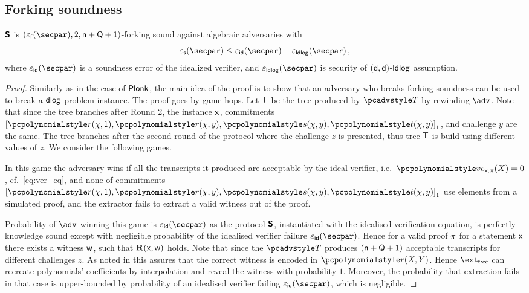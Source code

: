 \subsection{Forking soundness}
\begin{lemma}
	\label{lem:sonicprot_ss}
	$\bm{\mathsf{S}}$ is $(\epsss(\secpar), 2, \multconstr + \linconstr + 1)$-forking sound against
	algebraic adversaries with
	\[
	\epss(\secpar) \leq \epsid(\secpar) + \epsldlog(\secpar) \,,
	\]
	where $\epsid(\secpar)$ is a soundness error of the idealized verifier, and
	$\epsldlog(\secpar)$ is security of $(\mathsf{d}, \mathsf{d})$-$\mathsf{ldlog}$ assumption.
\end{lemma}
\begin{proof}
	Similarly as in the case of $\textnormal{\textsf{Plonk}}$, the main idea of the proof is to show
	that an adversary who breaks forking soundness can be used to break a $\mathsf{dlog}$ problem
	instance. The proof goes by game hops. Let $\mathsf{T}$ be the tree produced by
	$\tdv$ by rewinding $\adv$. Note that since the tree branches after Round 2,
	the instance $\mathsf{x}$, commitments
	$\gone{\p{r} (\chi, 1), \p{r} (\chi, y), \p{s} (\chi, y), \p{t} (\chi, y)}$, and challenge
	$y$ are the same. The tree branches after the second round
	of the protocol where the challenge $z$ is presented, thus tree $\mathsf{T}$ is
	build using different values of $z$.
	We consider the following games.
	
	 In this game the adversary wins if all the transcripts it
	produced are acceptable by the ideal verifier,
	i.e.~$\vereq_{\inp, \zkproof}(X) = 0$, cf.~\cref{eq:ver_eq}, and none of
	commitments
	$\gone{\p{r} (\chi, 1), \p{r} (\chi, y), \p{s} (\chi, y), \p{t} (\chi, y)}$ use
	elements from a simulated proof, and the extractor fails to extract a valid
	witness out of the proof.
	
	 Probability of
	$\adv$ winning this game is $\epsid(\secpar)$ as the protocol $\bm{\mathsf{S}}$,
	instantiated with the idealised verification equation, is perfectly
	knowledge sound except with negligible probability of the idealised verifier
	failure $\epsid(\secpar)$. Hence for a valid proof $\pi$ for a
	statement $\mathsf{x}$ there exists a witness $\mathsf{w}$, such that $\mathbf{R}(\mathsf{x}, \mathsf{w})$
	holds. Note that since the $\tdv$ produces $(\mathsf{n} + \mathsf{Q} + 1)$
	acceptable transcripts for different challenges $z$. As noted in
	\cite{CCS:MBKM19} this assures that the correct witness is encoded in
	$\p{r} (X, Y)$. Hence $\extt$ can recreate polynomials' coefficients by
	interpolation and reveal the witness with probability $1$. Moreover, the
	probability that extraction fails in that case is upper-bounded by
	probability of an idealised verifier failing $\epsid(\secpar)$, which is
	negligible.
	

\end{proof}
